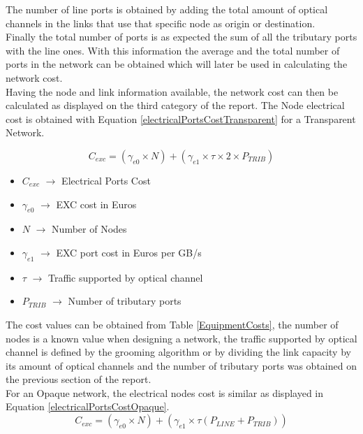 	The number of line ports is obtained by adding the total amount of optical channels in the links that use that specific node as origin or destination.\\
	
	Finally the total number of ports is as expected the sum of all the tributary ports with the line ones. With this information the average and the total number of ports in the network can be obtained which will later be used in calculating the network cost.\\
	
	Having the node and link information available, the network cost can then be calculated as displayed on the third category of the report.								
	The Node electrical cost is obtained with Equation \ref{electricalPortsCostTransparent} for a Transparent Network.
	
	\begin{equation}
		C_{exc} = \left(\gamma_{e0}\times N\right) + \left(\gamma_{e1} \times \tau \times 2 \times P_{TRIB}\right)
		\label{electricalPortsCostTransparent}
	\end{equation}
	
	\begin{itemize}
		\item{$C_{exc}$		$\rightarrow$	Electrical Ports Cost}
		\item{$\gamma_{e0}$	$\rightarrow$	EXC cost in Euros}
		\item{$N$			$\rightarrow$	Number of Nodes}
		\item{$\gamma_{e1}$	$\rightarrow$	EXC port cost in Euros per GB/s}
		\item{$\tau$		$\rightarrow$	Traffic supported by optical channel}
		\item{$P_{TRIB}$		$\rightarrow$	Number of tributary ports}
	\end{itemize}
	
	The cost values can be obtained from Table \ref{EquipmentCosts}, the number of nodes is a known value when designing a network, the traffic supported by optical channel is defined by the grooming algorithm or by dividing the link capacity by its amount of optical channels and the number of tributary ports was obtained on the previous section of the report. \\
	
	For an Opaque network, the electrical nodes cost is similar as displayed in Equation \ref{electricalPortsCostOpaque}.\\
	
	\begin{equation}
	C_{exc} = \left(\gamma_{e0}\times N\right) + \left(\gamma_{e1} \times \tau \left(P_{LINE} + P_{TRIB}\right)\right)
	\label{electricalPortsCostOpaque}
	\end{equation}	\\
	
